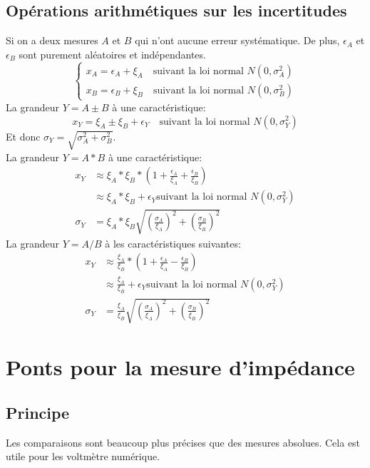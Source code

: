 \documentclass{report}
\begin{document}
\subsection{Opérations arithmétiques sur les incertitudes}
Si on a deux mesures $A$ et $B$ qui n'ont aucune erreur systématique. De plus, $\epsilon_A$ et $\epsilon_B$ sont purement aléatoires et indépendantes.
\begin{equation}
\begin{cases}
x_A = \epsilon_A + \xi_A \quad \text{suivant la loi normal }N(0, \sigma_A^2)\\
x_B = \epsilon_B + \xi_B \quad \text{suivant la loi normal }N(0, \sigma_B^2)
\end{cases}
\end{equation}
La grandeur $Y = A \pm B$ à une caractéristique:
\begin{equation}
x_Y = \xi_A \pm \xi_B + \epsilon_Y \quad \text{suivant la loi normal }N(0, \sigma_Y^2)
\end{equation}
Et donc $\sigma_Y = \sqrt{\sigma_A^2 + \sigma_B^2}$.\\
La grandeur $Y = A * B$ à une caractéristique:
\begin{align*}
x_Y & \approx \xi_A * \xi_B * \left( 1 + \frac{\epsilon_A}{\xi_A} + \frac{\epsilon_B}{\xi_B}  \right) \\
& \approx \xi_A * \xi_B + \epsilon_Y \text{suivant la loi normal }N(0, \sigma_Y^2)\\
\sigma_Y &= \xi_A * \xi_B \sqrt{\left( \frac{\sigma_A}{\xi_A}\right)^2 + \left( \frac{\sigma_B}{\xi_B}\right)^2}
\end{align*}
La grandeur $Y = A / B$ à les caractéristiques suivantes:
\begin{align*}
x_Y &\approx \frac{\xi_A}{\xi_B} * \left( 1 + \frac{\epsilon_A}{\xi_A} - \frac{\epsilon_B}{\xi_B} \right)\\
& \approx \frac{\xi_A}{\xi_B} + \epsilon_Y  \text{suivant la loi normal }N(0, \sigma_Y^2)\\
\sigma_Y &= \frac{\xi_A}{\xi_B} \sqrt{\left( \frac{\sigma_A}{\xi_A}\right)^2 + \left( \frac{\sigma_B}{\xi_B}\right)^2}
\end{align*}

\section{Ponts pour la mesure d'impédance}
\subsection{Principe}
Les comparaisons sont beaucoup plus précises que des mesures absolues. Cela est utile pour les voltmètre numérique.
\end{document}
